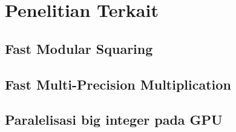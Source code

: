\section{Penelitian Terkait}
\subsection{Fast Modular Squaring}
\citep{drucker_gueron_2019}

\subsection{Fast Multi-Precision Multiplication}
\citep{hutter_wenger_2018}


\subsection{Paralelisasi big integer pada GPU}
\citep{gpu_bignum}


